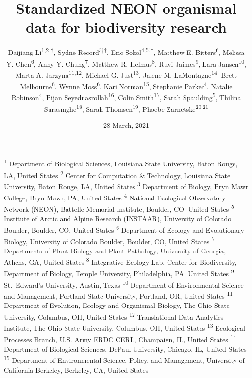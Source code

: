 \documentclass[
  12pt,
]{article}
\title{Standardized NEON organismal data for biodiversity research}
\author{Daijiang Li\textsuperscript{1,2†‡}, Sydne Record\textsuperscript{3†‡}, Eric Sokol\textsuperscript{4,5†‡}, Matthew E. Bitters\textsuperscript{6}, Melissa Y. Chen\textsuperscript{6}, Anny Y. Chung\textsuperscript{7}, Matthew R. Helmus\textsuperscript{8}, Ruvi Jaimes\textsuperscript{9}, Lara Jansen\textsuperscript{10}, Marta A. Jarzyna\textsuperscript{11,12}, Michael G. Just\textsuperscript{13}, Jalene M. LaMontagne\textsuperscript{14}, Brett Melbourne\textsuperscript{6}, Wynne Moss\textsuperscript{6}, Kari Norman\textsuperscript{15}, Stephanie Parker\textsuperscript{4}, Natalie Robinson\textsuperscript{4}, Bijan Seyednasrollah\textsuperscript{16}, Colin Smith\textsuperscript{17}, Sarah Spaulding\textsuperscript{5}, Thilina Surasinghe\textsuperscript{18}, Sarah Thomsen\textsuperscript{19}, Phoebe Zarnetske\textsuperscript{20,21}}
\date{28 March, 2021}
\makeatletter
\newcommand\iraggedright{%
  \let\\\@centercr\@rightskip\@flushglue \rightskip\@rightskip
  \leftskip\z@skip}
\makeatother
\begin{document}
\maketitle

\iraggedright

\footnotesize

\textsuperscript{1} Department of Biological Sciences, Louisiana State University, Baton Rouge, LA, United States\\
\textsuperscript{2} Center for Computation \& Technology, Louisiana State University, Baton Rouge, LA, United States\\
\textsuperscript{3} Department of Biology, Bryn Mawr College, Bryn Mawr, PA, United States\\
\textsuperscript{4} National Ecological Observatory Network (NEON), Battelle Memorial Institute, Boulder, CO, United States\\
\textsuperscript{5} Institute of Arctic and Alpine Research (INSTAAR), University of Colorado Boulder, Boulder, CO, United States\\
\textsuperscript{6} Department of Ecology and Evolutionary Biology, University of Colorado Boulder, Boulder, CO, United States\\
\textsuperscript{7} Departments of Plant Biology and Plant Pathology, University of Georgia, Athens, GA, United States\\
\textsuperscript{8} Integrative Ecology Lab, Center for Biodiversity, Department of Biology, Temple University, Philadelphia, PA, United States
\textsuperscript{9} St.~Edward's University, Austin, Texas
\textsuperscript{10} Department of Environmental Science and Management, Portland State University, Portland, OR, United States\\
\textsuperscript{11} Department of Evolution, Ecology and Organismal Biology, The Ohio State University, Columbus, OH, United States\\
\textsuperscript{12} Translational Data Analytics Institute, The Ohio State University, Columbus, OH, United States\\
\textsuperscript{13} Ecological Processes Branch, U.S. Army ERDC CERL, Champaign, IL, United States\\
\textsuperscript{14} Department of Biological Sciences, DePaul University, Chicago, IL, United States\\
\textsuperscript{15} Department of Environmental Science, Policy, and Management, University of California Berkeley, Berkeley, CA, United States\\
\end{document}
